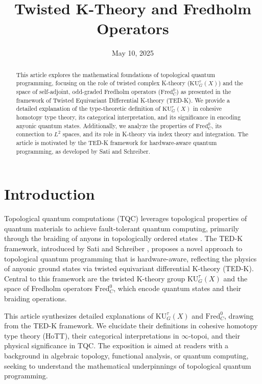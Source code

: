 \documentclass{article}
\title{Twisted K-Theory and Fredholm Operators}
\author{}
\date{May 10, 2025}
\theoremstyle{definition}
\begin{document}
\maketitle

\begin{abstract}
This article explores the mathematical foundations of topological quantum programming, focusing on the role of twisted complex K-theory (\(\mathrm{KU}^\tau_G(X)\)) and the space of self-adjoint, odd-graded Fredholm operators (\(\text{Fred}^0_C\)) as presented in the framework of Twisted Equivariant Differential K-theory (TED-K). We provide a detailed explanation of the type-theoretic definition of \(\mathrm{KU}^\tau_G(X)\) in cohesive homotopy type theory, its categorical interpretation, and its significance in encoding anyonic quantum states. Additionally, we analyze the properties of \(\text{Fred}^0_C\), its connection to \(L^2\) spaces, and its role in K-theory via index theory and integration. The article is motivated by the TED-K framework for hardware-aware quantum programming, as developed by Sati and Schreiber.
\end{abstract}

\section{Introduction}

Topological quantum computations (TQC) leverages topological
properties of quantum materials to achieve fault-tolerant
quantum computing, primarily through the braiding of anyons
in topologically ordered states \cite{Nayak2008}.
The TED-K framework, introduced by Sati and Schreiber \cite{SatiSchreiber2022},
proposes a novel approach to topological quantum programming that is hardware-aware,
reflecting the physics of anyonic ground states via twisted equivariant differential
K-theory (TED-K). Central to this framework are the twisted
K-theory group \(\mathrm{KU}^\tau_G(X)\) and the space of
Fredholm operators \(\text{Fred}^0_C\), which encode quantum
states and their braiding operations.

This article synthesizes detailed explanations of \(\mathrm{KU}^\tau_G(X)\) and \(\text{Fred}^0_C\), drawing from the TED-K framework. We elucidate their definitions in cohesive homotopy type theory (HoTT), their categorical interpretations in \(\infty\)-topoi, and their physical significance in TQC. The exposition is aimed at readers with a background in algebraic topology, functional analysis, or quantum computing, seeking to understand the mathematical underpinnings of topological quantum programming.
\end{document}
